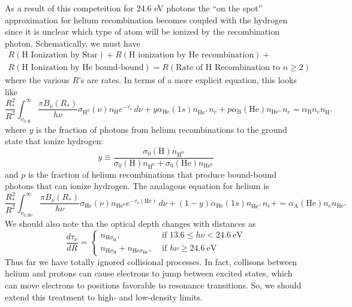 \documentclass[10pt]{article}
\numberwithin{equation}{section}
\newcommand{\n}{\noindent}
\begin{document}
\n As a result of this competeition for 24.6 eV photons the ``on the spot'' 
approximation for helium recombination becomes coupled with the hydrogen since
it is unclear which type of atom will be ionized by the recombination photon.
Schematically, we must have
\begin{multline}
  \label{eq:helium:1} R(\textrm{H Ionization by Star}) + R(\textrm{H ionization
  by He recombination}) + \\R(\textrm{H Ionization by He bound-bound}) =
  R(\textrm{Rate of H Recombination to }n\geq 2)
\end{multline}
where the various $R$'s are rates. In terms of a more explicit equation, this 
looks like
\begin{equation}
  \label{eq:helium:2} \frac{R_*^2}{R^2} \int_{\nu_{0,\mathrm{H}}}^\infty 
  \frac{\pi B_\nu(R_*)}{h\nu} \sigma_{\mathrm{H}^0}(\nu) n_{\mathrm{H}}
  e^{-\tau_\nu}\,d\nu + y \alpha_{\mathrm{He}}(1s) n_{\mathrm{He}^+}n_e +
  p \alpha_{\mathrm{B}}(\mathrm{He})n_{\mathrm{He^+}}n_e = \alpha_{\mathrm{B}}
  n_e n_{\mathrm{H^+}} 
\end{equation}
where $y$ is the fraction of photons from helium recombinations to the ground
state that ionize hydrogen:
\begin{equation}
  \label{eq:helium:3} y \equiv \frac{\sigma_0(\mathrm{H})n_{\mathrm{H^0}}}{
  \sigma_0(\mathrm{H})n_{\mathrm{H^0}} + \sigma_0(\mathrm{He})n_{\mathrm{He^0}}}
\end{equation}
and $p$ is the fraction of helium recombinations that produce bound-bound
photons that can ionize hydrogen. The analagous equation for helium is
\begin{equation}
  \label{eq:helium:4} \frac{R_*^2}{R^2} \int_{\nu_{0,\mathrm{He}}}^\infty
  \frac{\pi B_\nu(R_*)}{h\nu} \sigma_{\mathrm{He}}(\nu) n_{\mathrm{He^0}}
  e^{-\tau_\nu(\mathrm{He})}\,d\nu + (1-y) \alpha_{\mathrm{He}}(1s)
  n_{\mathrm{He}^+}n_e + = \alpha_{\mathrm{A}}(\mathrm{He}) n_e
  n_{\mathrm{He^+}}
\end{equation}
We should also note tha the optical depth changes with distances as
\begin{equation}
  \label{eq:helium:5} \frac{d\tau_\nu}{dR} = \begin{cases}
  n_{\mathrm{H}\sigma_{\mathrm{H}}}, &\text{ if }13.6\leq h\nu < 24.6\
  \mathrm{eV}\\ n_{\mathrm{H}\sigma_{\mathrm{H}}} +
  n_{\mathrm{He}\sigma_{\mathrm{He}}}, &\text{ if } h\nu \geq 24.6\ \mathrm{eV}
  \end{cases}
\end{equation}
Thus far we have totally ignored collisional processes. In fact, collisons 
between helium and protons can cause electrons to jump between excited states, 
which can move electrons to positions favorable to resonance transitions. So,
we should extend this treatment to high- and low-density limits.\\
\end{document}

